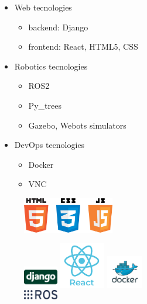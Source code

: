 \documentclass[notes,slidesec,a4]{seminar}
\begin{document}
\begin{hslide}
\begin{minipage}[t]{7cm}
    \begin{itemize}
    \item Web tecnologies
      \begin{itemize}
      \item backend: Django
      \item frontend: React, HTML5, CSS
      \end{itemize}
    \item Robotics tecnologies
      \begin{itemize}
      \item ROS2
      \item Py\_trees
      \item Gazebo, Webots simulators
      \end{itemize}
    \item DevOps tecnologies
      \begin{itemize}
      \item Docker
      \item VNC
      \end{itemize}
    \end{itemize}
\end{minipage}
\begin{minipage}[t]{5cm}
  \begin{figure}
    \centerline{\includegraphics[width=4cm]{figs/html5.png}}
    \includegraphics[width=1.5cm]{figs/Django-Logo.png}
    \includegraphics[width=2cm]{figs/react-logo.png}
    \includegraphics[width=1.6cm]{figs/docker-logo.png}\\
    \includegraphics[width=1.5cm]{figs/Ros-logo.png}
  \end{figure}
\end{minipage}



\end{hslide}
\end{document}
